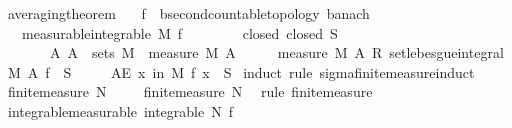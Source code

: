 \begin{isabellebody}
\begin{isamarkuptext}
\end{isamarkuptext}\isamarkuptrue%
\isamarkupfalse%
\ averaging{\isacharunderscore}{\kern0pt}theorem{\isacharcolon}{\kern0pt}\isanewline
\ \ \ f{\isacharcolon}{\kern0pt}{\isacharcolon}{\kern0pt}{\isachardoublequoteopen}{\isacharunderscore}{\kern0pt}\ {\isasymRightarrow}\ {\isacharprime}{\kern0pt}b{\isacharcolon}{\kern0pt}{\isacharcolon}{\kern0pt}{\isacharbraceleft}{\kern0pt}second{\isacharunderscore}{\kern0pt}countable{\isacharunderscore}{\kern0pt}topology{\isacharcomma}{\kern0pt}\ banach{\isacharbraceright}{\kern0pt}{\isachardoublequoteclose}\isanewline
\ \ \ {\isacharbrackleft}{\kern0pt}measurable{\isacharbrackright}{\kern0pt}{\isacharcolon}{\kern0pt}{\isachardoublequoteopen}integrable\ M\ f{\isachardoublequoteclose}\ \isanewline
\ \ \ \ \ \ \ closed{\isacharcolon}{\kern0pt}\ {\isachardoublequoteopen}closed\ S{\isachardoublequoteclose}\isanewline
\ \ \ \ \ \ \ {\isachardoublequoteopen}{\isasymAnd}A{\isachardot}{\kern0pt}\ A\ {\isasymin}\ sets\ M\ {\isasymLongrightarrow}\ measure\ M\ A\ {\isachargreater}{\kern0pt}\ {}\ {\isasymLongrightarrow}\ {\isacharparenleft}{\kern0pt}{}\ {\isacharslash}{\kern0pt}\ measure\ M\ A{\isacharparenright}{\kern0pt}\ {\isacharasterisk}{\kern0pt}\isactrlsub R\ set{\isacharunderscore}{\kern0pt}lebesgue{\isacharunderscore}{\kern0pt}integral\ M\ A\ f\ {\isasymin}\ S{\isachardoublequoteclose}\isanewline
\ \ \ \ \ {\isachardoublequoteopen}AE\ x\ in\ M{\isachardot}{\kern0pt}\ f\ x\ {\isasymin}\ S{\isachardoublequoteclose}\isanewline
%
\isadelimproof
%
\endisadelimproof
%
\isatagproof
{}\isamarkupfalse%
\ {\isacharparenleft}{\kern0pt}induct\ rule{\isacharcolon}{\kern0pt}\ sigma{\isacharunderscore}{\kern0pt}finite{\isacharunderscore}{\kern0pt}measure{\isacharunderscore}{\kern0pt}induct{\isacharparenright}{\kern0pt}\isanewline
\ \ \isamarkupfalse%
\ {\isacharparenleft}{\kern0pt}finite{\isacharunderscore}{\kern0pt}measure\ N\ {\isasymOmega}{\isacharparenright}{\kern0pt}\isanewline
\isanewline
\ \ \isamarkupfalse%
\ finite{\isacharunderscore}{\kern0pt}measure\ N\ \isamarkupfalse%
\ {\isacharparenleft}{\kern0pt}rule\ finite{\isacharunderscore}{\kern0pt}measure{\isacharparenright}{\kern0pt}\isanewline
\ \ \isanewline
\ \ \isamarkupfalse%
\ integrable{\isacharbrackleft}{\kern0pt}measurable{\isacharbrackright}{\kern0pt}{\isacharcolon}{\kern0pt}\ {\isachardoublequoteopen}integrable\ N\ f{\isachardoublequoteclose}\ \isamarkupfalse%

\end{isabellebody}
